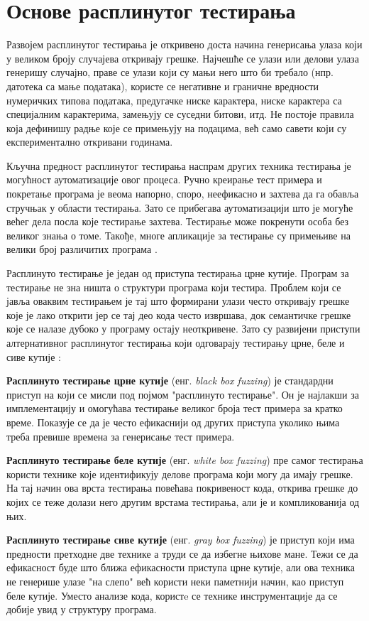 \documentclass[12pt,oneside]{memoir}
\begin{document}
\section{Основе расплинутог тестирања}

Развојем расплинутог тестирања је откривено доста начина генерисања улаза који у великом броју случајева откривају грешке. Најчешће се улази или делови улаза генеришу случајно, праве се улази који су мањи него што би требало (нпр. датотека са мање података), користе се негативне и граничне вредности нумеричких типова података, предугачке ниске карактера, ниске карактера са специјалним карактерима, замењују се суседни битови, итд. Не постоје правила која дефинишу радње које се примењују на подацима, већ само савети који су експериментално откривани годинама.  

Кључна предност расплинутог тестирања наспрам других техника тестирања је могућност аутоматизације овог процеса. Ручно креирање тест примера и покретање програма је веома напорно, споро, неефикасно и захтева да га обавља стручњак у области тестирања. Зато се прибегава аутоматизацији што је могуће већег дела посла које тестирање захтева. Тестирање може покренути особа без великог знања о томе. Такође, многе апликације за тестирање су примењиве на велики број различитих програма \cite{fuzzingBrute, fuzzing}.

Расплинуто тестирање је један од приступа тестирања црне кутије. Програм за тестирање не зна ништа о структури програма који тестира. Проблем који се јавља оваквим тестирањем је тај што формирани улази често откривају грешке које је лако открити јер се тај део кода често извршава,  док семантичке грешке које се налазе дубоко у програму остају неоткривене. Зато су развијени приступи алтернативног расплинутог тестирања који одговарају тестирању црне, беле и сиве кутије \cite{fuzzing, grayBoxFuzzing, whiteBoxFuzzing}:
\begin{description}
\item\textbf{Расплинуто тестирање црне кутије} (енг. \textit{black box fuzzing}) је стандардни приступ на који се мисли под појмом "расплинуто тестирање". Он је најлакши за имплементацију и омогућава тестирање великог броја тест примера за кратко време. Показује се да је често ефикаснији од других приступа уколико њима треба превише времена за генерисање тест примера.
\item\textbf{Расплинуто тестирање беле кутије} (енг. \textit{white box fuzzing}) пре самог тестирања користи технике које идентификују делове програма који могу да имају грешке. На тај начин ова врста тестирања повећава покривеност кода, открива грешке до којих се теже долази него другим врстама тестирања, али је и компликованија од њих. 
\item\textbf{Расплинуто тестирање сиве кутије} (енг. \textit{gray box fuzzing}) је приступ који има предности претходне две технике а труди се да избегне њихове мане. Тежи се да ефикасност буде што ближа ефикасности приступа црне кутије, али ова техника не генерише улазе "на слепо" већ користи неки паметнији начин, као приступ беле кутије. Уместо анализе кода, користe се технике инструментације да се добије увид у структуру програма.
\end{description}
\end{document}
